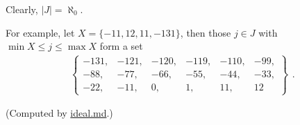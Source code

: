Clearly, $|J| = \aleph_0$.

For example, let $X = \{ -11,12,11, -131 \}$, then those $j \in J$ with $\min X \le j \le \max X$ form a set
$$
\begin{aligned}
\left\{
\begin{matrix}
-131, & -121, & -120, & -119, & -110, & -99, \\
-88, & -77, & -66, & -55, & -44, & -33, \\
-22, & -11, & 0, & 1, & 11, & 12
\end{matrix}
\right\}	
\end{aligned}.
$$

(Computed by \href{https://github.com/Wenchuan5000/TeX/blob/main/Algebra/reference/c1/s3/ideal.md}{ideal.md}.)
















%